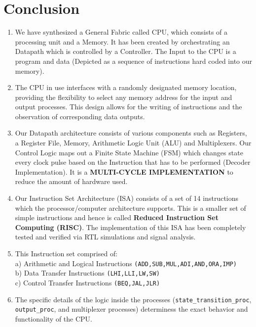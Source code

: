 \documentclass{article}
\begin{document}
\section{Conclusion}
\begin{enumerate}
\item We have synthesized a General Fabric called CPU, which consists of a processing unit and a Memory. It has been created by orchestrating an Datapath which is controlled by a Controller. The Input to the CPU is a program and data (Depicted as a sequence of instructions hard coded into our memory).
\item The CPU in use interfaces with a randomly designated memory location, providing the flexibility to select any memory address for the input and output processes. This design allows for the writing of instructions and the observation of corresponding data outputs.
\item Our Datapath architecture consists of various components such as Registers, a Register File, Memory, Arithmetic Logic Unit (ALU) and Multiplexers. Our Control Logic maps out a Finite State Machine (FSM) which changes state every clock pulse based on the Instruction that has to be performed (Decoder Implementation). It is a \textbf{MULTI-CYCLE IMPLEMENTATION} to reduce the amount of hardware used.
\item Our Instruction Set Architecture (ISA) consists of a set of 14 instructions which the processor/computer architecture supports. This is a smaller set of simple instructions and hence is called \textbf{Reduced Instruction Set Computing (RISC)}.  The implementation of this ISA has been completely tested and verified via RTL simulations and signal analysis.
\item This Instruction set comprised of: \\
a) Arithmetic and Logical Instructions \texttt{(ADD,SUB,MUL,ADI,AND,ORA,IMP)}\\
b) Data Transfer Instructions \texttt{(LHI,LLI,LW,SW)}\\
c) Control Transfer Instructions \texttt{(BEQ,JAL,JLR)}
\item The specific details of the logic inside the processes (\texttt{state\_transition\_proc}, \texttt{output\_proc}, and multiplexer processes) determiness the exact behavior and functionality of the CPU.
\end{enumerate}
\end{document}
